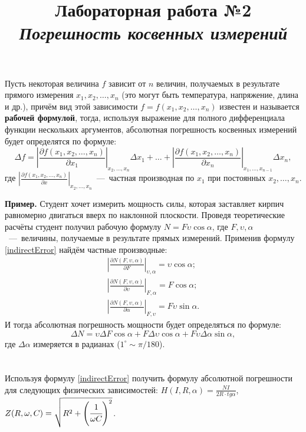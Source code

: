 \documentclass[14pt,a4paper]{article}
\title{Лабораторная работа №2 \\ \textit{Погрешность косвенных измерений}}
\begin{document}
\maketitle
Пусть некоторая величина $f$ зависит от $n$ величин, получаемых в результате прямого измерения  $x_1, x_2, \ldots, x_n$ (это могут быть температура, напряжение, длина и др.), причём вид этой зависимости $f = f(x_1, x_2, \ldots, x_n)$ известен и называется \textbf{рабочей формулой}, тогда, используя выражение для полного дифференциала функции нескольких аргументов, абсолютная погрешность косвенных измерений будет определятся по формуле:
\begin{equation} \label{indirectError}
    \Delta f = \left | \frac{\partial f(x_1, x_2, \ldots, x_n)}{\partial x_1} \right |_{x_2, \ldots, x_n} \Delta x_1 + \ldots + \left | \frac{\partial f(x_1, x_2, \ldots, x_n)}{\partial x_n} \right |_{x_1, \ldots, x_{n-1}} \Delta x_n,
\end{equation}
где $\left | \frac{\partial f(x_1, x_2, \ldots, x_n)}{\partial x} \right |_{x_2, \ldots, x_n}$~---~частная производная по $x_1$ при постоянных $x_2, \ldots, x_n$.

\textbf{Пример.}
Студент хочет измерить мощность силы, которая заставляет кирпич равномерно двигаться вверх по наклонной плоскости. Проведя теоретические расчёты студент получил рабочую формулу $N = F\upsilon\cos{\alpha}$, где $F, \upsilon, \alpha$~---~величины, получаемые в результате прямых измерений. Применив формулу \ref{indirectError} найдём частные производные:
\begin{gather*}
    \left | \frac{\partial N(F, \upsilon, \alpha)}{\partial F} \right |_{\upsilon, \alpha} = \upsilon\cos{\alpha} ; \\
    \left | \frac{\partial N(F, \upsilon, \alpha)}{\partial \upsilon} \right |_{F, \alpha} = F\cos{\alpha} ; \\
    \left | \frac{\partial N(F, \upsilon, \alpha)}{\partial \alpha} \right |_{F, \upsilon} = F\upsilon\sin{\alpha}.
\end{gather*}
И тогда абсолютная погрешность мощности будет определяться по формуле:
\begin{equation*}
    \Delta N = \upsilon\Delta F\cos{\alpha} + F\Delta \upsilon\cos{\alpha} + F\upsilon\Delta\alpha\sin{\alpha},
\end{equation*}
где $\Delta\alpha$ измеряется в радианах ($1^\circ \sim \pi/180$).
\progress{}
\section{}
Используя формулу \ref{indirectError} получить формулу абсолютной погрешности для следующих физических зависимостей:
$H(I,R,\alpha) = \frac{NI}{2R\cdot tg\alpha}$, $Z(R,\omega, C) = \sqrt{R^2+\left (\cfrac{1}{\omega C} \right )^2}$. \\
\end{document}
